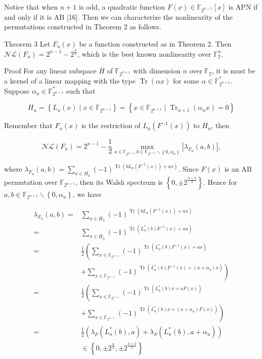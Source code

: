 \documentclass[10pt]{article}
\begin{document}
Notice that when $n+1$ is odd, a quadratic function $F(x) \in \mathbb{F}_{2^{n+1}}[x]$ is APN if and only if it is AB [16]. Then we can characterize the nonlinearity of the permutations constructed in Theorem 2 as follows.

Theorem 3 Let $F_{u}(x)$ be a function constructed as in Theorem 2. Then $\mathcal{N} \mathcal{L}\left(F_{u}\right)=2^{n-1} -2^{\frac{n}{2}}$, which is the best known nonlinearity over $\mathbb{F}_{2}^{n}$.

Proof For any linear subspace $H$ of $\mathbb{F}_{2^{n+1}}$ with dimension $n$ over $\mathbb{F}_{2}$, it is must be a kernel of a linear mapping with the type $\operatorname{Tr}(\alpha x)$ for some $\alpha \in \mathbb{F}_{2^{n+1}}^{*}$. Suppose $\alpha_{u} \in \mathbb{F}_{2^{n+1}}^{*}$ such that

$$
H_{u}=\left\{L_{u}(x) \mid x \in \mathbb{F}_{2^{n+1}}\right\}=\left\{x \in \mathbb{F}_{2^{n+1}} \mid \operatorname{Tr}_{n+1}\left(\alpha_{u} x\right)=0\right\}
$$

Remember that $F_{u}(x)$ is the restriction of $L_{u}\left(F^{-1}(x)\right)$ to $H_{u}$, then

$$
\mathcal{N} \mathcal{L}\left(F_{u}\right)=2^{n-1}-\frac{1}{2} \max _{a \in \mathbb{F}_{2^{n+1}}, b \in \mathbb{F}_{2^{n+1}} \backslash\left\{0, \alpha_{u}\right\}}\left|\lambda_{F_{u}}(a, b)\right|,
$$

where $\lambda_{F_{u}}(a, b)=\sum_{x \in H_{u}}(-1)^{\operatorname{Tr}\left(b L_{u}\left(F^{-1}(x)\right)+a x\right)}$. Since $F(x)$ is an AB permutation over $\mathbb{F}_{2^{n+1}}$, then its Walsh spectrum is $\left\{0, \pm 2^{\frac{n+2}{2}}\right\}$. Hence for $a, b \in \mathbb{F}_{2^{n+1}} \backslash\left\{0, \alpha_{u}\right\}$, we have

$$
\begin{aligned}
\lambda_{F_{u}}(a, b)= & \sum_{x \in H_{u}}(-1)^{\operatorname{Tr}\left(b L_{u}\left(F^{-1}(x)\right)+a x\right)} \\
= & \sum_{x \in H_{u}}(-1)^{\operatorname{Tr}\left(L_{u}^{*}(b) F^{-1}(x)+a x\right)} \\
= & \frac{1}{2}\left(\sum_{x \in \mathbb{F}_{2^{n+1}}}(-1)^{\operatorname{Tr}\left(L_{u}^{*}(b) F^{-1}(x)+a x\right)}\right. \\
& \left.+\sum_{x \in \mathbb{F}_{2^{n+1}}}(-1)^{\operatorname{Tr}\left(L_{u}^{*}(b) F^{-1}(x)+\left(a+\alpha_{u}\right) x\right)}\right) \\
= & \frac{1}{2}\left(\sum_{x \in \mathbb{F}_{2^{n+1}}}(-1)^{\operatorname{Tr}\left(L_{u}^{*}(b) x+a F(x)\right)}\right. \\
& \left.+\sum_{x \in \mathbb{F}_{2^{n+1}}}(-1)^{\operatorname{Tr}\left(L_{u}^{*}(b) x+\left(a+\alpha_{u}\right) F(x)\right)}\right) \\
= & \frac{1}{2}\left(\lambda_{F}\left(L_{u}^{*}(b), a\right)+\lambda_{F}\left(L_{u}^{*}(b), a+\alpha_{u}\right)\right) \\
& \in\left\{0, \pm 2^{\frac{n}{2}}, \pm 2^{\frac{n+2}{2}}\right\}
\end{aligned}
$$
\end{document}
